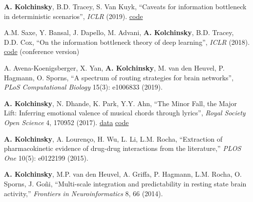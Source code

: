 \textbf{A. Kolchinsky}\CA, B.D. Tracey, S. Van Kuyk, ``Caveats for information bottleneck in deterministic scenarios'', \emph{ICLR} (2019).  \href{https://github.com/artemyk/ibcurve}{code} 

A.M. Saxe, Y. Bansal, J. Dapello, M. Advani, \textbf{A. Kolchinsky}, B.D. Tracey, D.D. Cox, ``On the information bottleneck theory of deep learning'', \emph{ICLR} (2018).  \href{https://github.com/artemyk/ibsgd/tree/iclr2018}{code}  (conference version)


\vspace{15pt}


A. Avena-Koenigsberger, X. Yan, \textbf{A. Kolchinsky}, M. van den Heuvel, P. Hagmann, O. Sporns, ``A spectrum of routing strategies for brain networks'', \emph{PLoS Computational Biology} 15(3): e1006833 (2019).  

\textbf{A. Kolchinsky}, N. Dhande, K. Park, Y.Y. Ahn, ``The Minor Fall, the Major Lift: Inferring emotional valence of musical chords through lyrics'', \emph{Royal Society Open Science} 4, 170952 (2017).  \href{https://doi.org/10.6084/m9.figshare.5413060.v1.}{data} \href{https://github.com/artemyk/chordsentiment}{code} 

\textbf{A. Kolchinsky}, A. Lourenço, H. Wu, L. Li, L.M. Rocha, ``Extraction of pharmacokinetic evidence of drug-drug interactions from the literature,'' \emph{PLOS One} 10(5): e0122199 (2015).  

\textbf{A. Kolchinsky}, M.P. van den Heuvel, A. Griffa, P. Hagmann, L.M. Rocha, O. Sporns, J. Goñi, ``Multi-scale integration and predictability in resting state brain activity,'' \emph{Frontiers in Neuroinformatics} 8, 66 (2014).  

